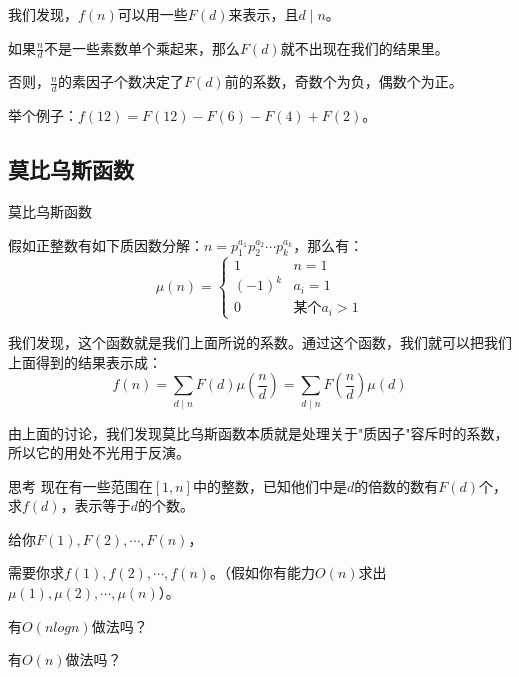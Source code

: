 \documentclass[9pt]{beamer}
\begin{document}
			\begin{frame}
				我们发现，$f(n)$可以用一些$F(d)$来表示，且$d \mid n$。
				
				如果$\frac{n}{d}$不是一些素数单个乘起来，那么$F(d)$就不出现在我们的结果里。
				
				否则，$\frac{n}{d}$的素因子个数决定了$F(d)$前的系数，奇数个为负，偶数个为正。
				
							\pause
				
				举个例子：$f(12) = F(12) - F(6) - F(4) + F(2)$。
				
			\end{frame}
			
			\subsection{莫比乌斯函数}
			\begin{frame}{莫比乌斯函数}
				\begin{definition}[莫比乌斯函数]
					假如正整数有如下质因数分解：$n = p_1^{a_1}p_2^{a_2}\cdots p_k^{a_k}$，那么有：
					$$
						\mu(n) = 
							\begin{cases}
								1 & n = 1 \\
								(-1)^k & a_i = 1 \\
								0 & \text{某个$a_i>1$} 
							\end{cases}
					$$
				\end{definition}
				
							\pause
				
				我们发现，这个函数就是我们上面所说的系数。通过这个函数，我们就可以把我们上面得到的结果表示成：
				$$
					f(n) = \sum_{d \mid n} F(d)\mu(\frac{n}{d}) = \sum_{d \mid n} F(\frac{n}{d})\mu(d)
				$$
			\end{frame}
			
			\begin{frame}
				由上面的讨论，我们发现莫比乌斯函数本质就是处理关于"质因子"容斥时的系数，所以它的用处不光用于反演。
				
							\pause
				
				\begin{block}{思考}
					现在有一些范围在$[1,n]$中的整数，已知他们中是$d$的倍数的数有$F(d)$个，求$f(d)$，表示等于$d$的个数。
					
					给你$F(1),F(2),\cdots,F(n)$，
					
					需要你求$f(1), f(2), \cdots, f(n)$。（假如你有能力$O(n)$求出$\mu(1), \mu(2), \cdots , \mu(n)$）。
				\end{block}
				
				\pause
				有$O(nlogn)$做法吗？
				
				\pause
				有$O(n)$做法吗？
			\end{frame}
			
\end{document}
